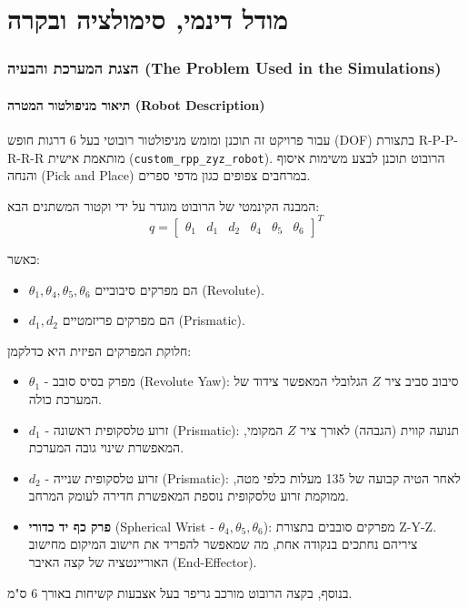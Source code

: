\documentclass[11pt,a4paper]{article}
\begin{document}
\newpage
{}
\setcounter{page}{1}
\tableofcontents
\newpage
\begingroup\small
\listoffigures
\newpage
\listoftables
\endgroup
\newpage
{}
\setcounter{page}{1}

\part{מודל דינמי, סימולציה ובקרה}

\section{הצגת המערכת והבעיה (\textenglish{The Problem Used in the Simulations})}

\subsection{תיאור מניפולטור המטרה (\textenglish{Robot Description})}
עבור פרויקט זה תוכנן ומומש מניפולטור רובוטי בעל 6 דרגות חופש (\textenglish{DOF}) בתצורת \textenglish{R-P-P-R-R-R} מותאמת אישית (\texttt{custom\_rpp\_zyz\_robot}). הרובוט תוכנן לבצע משימות איסוף והנחה (\textenglish{Pick and Place}) במרחבים צפופים כגון מדפי ספרים.

המבנה הקינמטי של הרובוט מוגדר על ידי וקטור המשתנים הבא:
\begin{equation}
q = \begin{bmatrix}\theta_1 & d_1 & d_2 & \theta_4 & \theta_5 & \theta_6\end{bmatrix}^T
\end{equation}

כאשר:
\begin{itemize}
    \item $\theta_1, \theta_4, \theta_5, \theta_6$ הם מפרקים סיבוביים (\textenglish{Revolute}).
    \item $d_1, d_2$ הם מפרקים פריזמטיים (\textenglish{Prismatic}).
\end{itemize}

חלוקת המפרקים הפיזית היא כדלקמן:
\begin{itemize}
    \item $\theta_1$ - מפרק בסיס סובב (\textenglish{Revolute Yaw}): סיבוב סביב ציר $Z$ הגלובלי המאפשר צידוד של המערכת כולה.
    \item $d_1$ - זרוע טלסקופית ראשונה (\textenglish{Prismatic}): תנועה קווית (הגבהה) לאורך ציר $Z$ המקומי, המאפשרת שינוי גובה המערכת.
    \item $d_2$ - זרוע טלסקופית שנייה (\textenglish{Prismatic}): לאחר הטיה קבועה של 135 מעלות כלפי מטה, ממוקמת זרוע טלסקופית נוספת המאפשרת חדירה לעומק המרחב.
    \item \textbf{פרק כף יד כדורי} (\textenglish{Spherical Wrist} - $\theta_4, \theta_5, \theta_6$): מפרקים סובבים בתצורת Z-Y-Z. ציריהם נחתכים בנקודה אחת, מה שמאפשר להפריד את חישוב המיקום מחישוב האוריינטציה של קצה האיבר (\textenglish{End-Effector}).
\end{itemize}
בנוסף, בקצה הרובוט מורכב גריפר בעל אצבעות קשיחות באורך 6 ס"מ.
\end{document}
